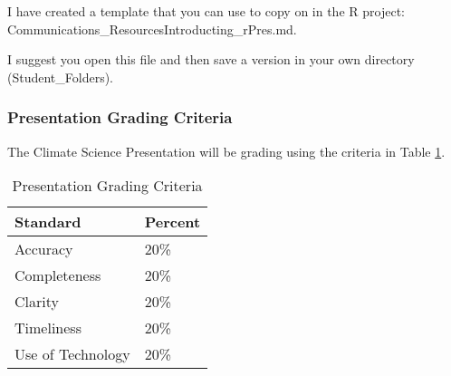 I have created a template that you can use to copy on in the R project: Communications_Resources\/Introducting\_rPres.md. 

I suggest you open this file and then save a version in your own directory (Student\_Folders).

\subsubsection{Presentation Grading Criteria}

The Climate Science Presentation will be grading using the criteria in Table \ref{tab:presentationgrading}.

\begin{table}[h]
\centering
\caption{Presentation Grading Criteria}
\label{tab:presentationgrading}
\begin{tabular}{ll}\hline
Standard            & Percent \\ \hline\hline    
Accuracy            & 20\%  \\
Completeness        & 20\% \\
Clarity             & 20\% \\
Timeliness          & 20\% \\
Use of Technology   & 20\% \\ \hline
\end{tabular}
\end{table}